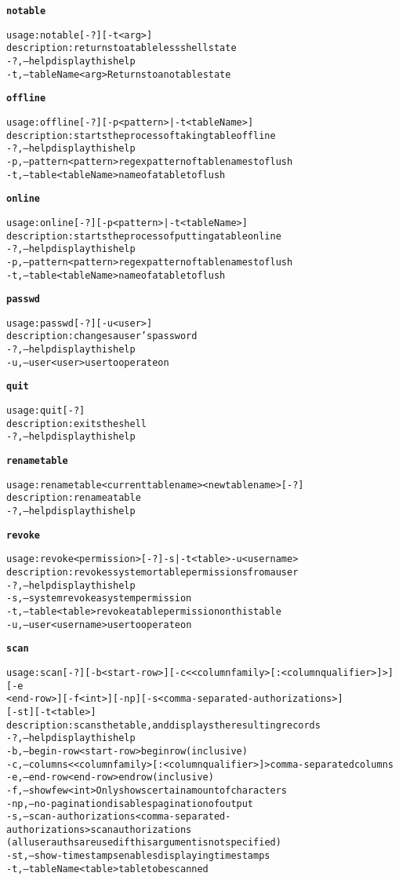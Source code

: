 \begin{alltt}
\textbf{notable}

    usage: notable [-?] [-t <arg>]
    description: returns to a tableless shell state
      -?,--help  display this help
      -t,--tableName <arg>	Returns to a no table state

\textbf{offline}

    usage: offline [-?] [-p <pattern> | -t <tableName>]
    description: starts the process of taking table offline
      -?,--help  display this help
      -p,--pattern <pattern>  regex pattern of table names to flush
      -t,--table <tableName>  name of a table to flush

\textbf{online}

    usage: online [-?] [-p <pattern> | -t <tableName>]
    description: starts the process of putting a table online
      -?,--help  display this help
      -p,--pattern <pattern>  regex pattern of table names to flush
      -t,--table <tableName>  name of a table to flush

\textbf{passwd}

    usage: passwd [-?] [-u <user>]
    description: changes a user's password
      -?,--help  display this help
      -u,--user <user>  user to operate on

\textbf{quit}

    usage: quit [-?]
    description: exits the shell
      -?,--help  display this help

\textbf{renametable}

    usage: renametable <current table name> <new table name> [-?]
    description: rename a table
      -?,--help  display this help

\textbf{revoke}

    usage: revoke <permission> [-?] -s | -t <table>  -u <username>
    description: revokes system or table permissions from a user
      -?,--help  display this help
      -s,--system  revoke a system permission
      -t,--table <table>  revoke a table permission on this table
      -u,--user <username>	user to operate on

\textbf{scan}

    usage: scan [-?] [-b <start-row>] [-c <{<columnfamily>[:<columnqualifier>]}>] [-e
    	      <end-row>] [-f <int>] [-np] [-s <comma-separated-authorizations>]
    	      [-st] [-t <table>]
    description: scans the table, and displays the resulting records
      -?,--help  display this help
      -b,--begin-row <start-row>  begin row (inclusive)
      -c,--columns <{<columnfamily>[:<columnqualifier>]}>  comma-separated columns
      -e,--end-row <end-row>  end row (inclusive)
      -f,--show few <int>  Only shows certain amount of characters
      -np,--no-pagination  disables pagination of output
      -s,--scan-authorizations <comma-separated-authorizations>  scan authorizations
    	      (all user auths are used if this argument is not specified)
      -st,--show-timestamps  enables displaying timestamps
      -t,--tableName <table>  table to be scanned


\end{alltt}
